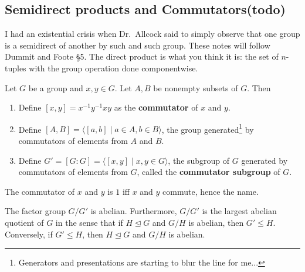 \subsection{Semidirect products and Commutators(todo)}
I had an existential crisis when Dr.\ Allcock said to simply observe that one group is a semidirect of another by such and such group. These notes will follow Dummit and Foote \S 5.
\orbreak
The direct product is what you think it is: the set of $n$-tuples with the group operation done componentwise.

\begin{definition}[Commutators]
    Let $G$ be a group and $x,y\in G$. Let $A,B$ be nonempty subsets of $G$. Then 
    \begin{enumerate}
        \item Define $[x,y]=x^{-1}y^{-1}xy$ as the \textbf{commutator} of $x$ and $y$.
        \item Define $[A,B]=\langle [a,b] \mid a\in A,b\in B \rangle $, the group generated\footnote{Generators and presentations are starting to blur the line for me...} by commutators of elements from $A$ and $B$.
        \item Define $G'=[G:G]=\langle [x,y] \mid x,y\in G \rangle $, the subgroup of $G$ generated by commutators of elements from $G$, called the \textbf{commutator subgroup} of $G$.
    \end{enumerate}
\end{definition}
The commutator of $x$ and $y$ is $1$ iff $x$ and $y$ commute, hence the name.
\begin{prop}
    The factor group $G /G'$ is abelian. Furthermore, $G /G'$ is the largest abelian quotient of $G$ in the sense that if $H \trianglelefteq G$ and $G /H$ is abelian, then $G'\leq H$. Conversely, if $G' \leq H$, then $H \trianglelefteq G$ and $G /H$ is abelian.
\end{prop}
